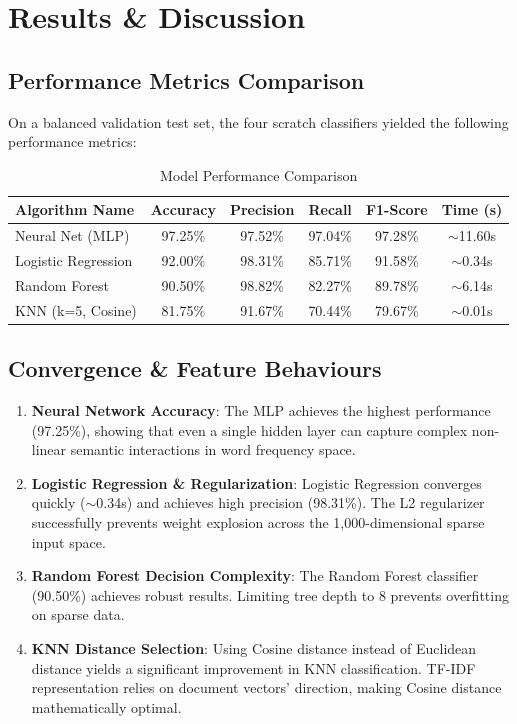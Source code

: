\documentclass[conference]{IEEEtran}
\begin{document}
\section{Results \& Discussion}

\subsection{Performance Metrics Comparison}
On a balanced validation test set, the four scratch classifiers yielded the following performance metrics:

\begin{table}[htbp]
\caption{Model Performance Comparison}
\begin{center}
\begin{tabular}{lccccc}
\toprule
\textbf{Algorithm Name} & \textbf{Accuracy} & \textbf{Precision} & \textbf{Recall} & \textbf{F1-Score} & \textbf{Time (s)} \\
\midrule
Neural Net (MLP) & 97.25\% & 97.52\% & 97.04\% & 97.28\% & $\sim$11.60s \\
Logistic Regression & 92.00\% & 98.31\% & 85.71\% & 91.58\% & $\sim$0.34s \\
Random Forest & 90.50\% & 98.82\% & 82.27\% & 89.78\% & $\sim$6.14s \\
KNN (k=5, Cosine) & 81.75\% & 91.67\% & 70.44\% & 79.67\% & $\sim$0.01s \\
\bottomrule
\end{tabular}
\label{tab:results}
\end{center}
\end{table}

\subsection{Convergence \& Feature Behaviours}
\begin{enumerate}
\item \textbf{Neural Network Accuracy}: The MLP achieves the highest performance (97.25\%), showing that even a single hidden layer can capture complex non-linear semantic interactions in word frequency space.
\item \textbf{Logistic Regression \& Regularization}: Logistic Regression converges quickly ($\sim$0.34s) and achieves high precision (98.31\%). The L2 regularizer successfully prevents weight explosion across the 1,000-dimensional sparse input space.
\item \textbf{Random Forest Decision Complexity}: The Random Forest classifier (90.50\%) achieves robust results. Limiting tree depth to 8 prevents overfitting on sparse data.
\item \textbf{KNN Distance Selection}: Using Cosine distance instead of Euclidean distance yields a significant improvement in KNN classification. TF-IDF representation relies on document vectors' direction, making Cosine distance mathematically optimal.
\end{enumerate}
\end{document}
